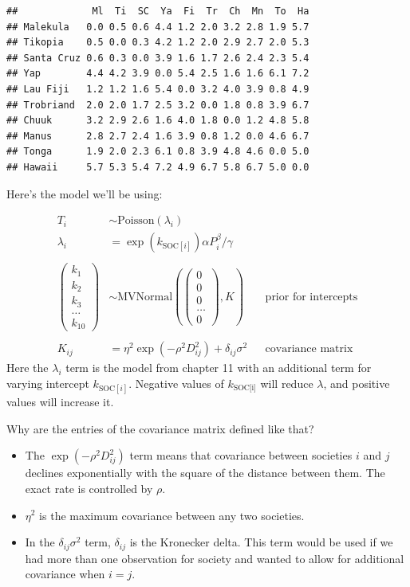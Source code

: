 \documentclass[
]{book}
\providecommand{\tightlist}{%
  \setlength{\itemsep}{0pt}\setlength{\parskip}{0pt}}
\begin{document}
\begin{verbatim}
##             Ml  Ti  SC  Ya  Fi  Tr  Ch  Mn  To  Ha
## Malekula   0.0 0.5 0.6 4.4 1.2 2.0 3.2 2.8 1.9 5.7
## Tikopia    0.5 0.0 0.3 4.2 1.2 2.0 2.9 2.7 2.0 5.3
## Santa Cruz 0.6 0.3 0.0 3.9 1.6 1.7 2.6 2.4 2.3 5.4
## Yap        4.4 4.2 3.9 0.0 5.4 2.5 1.6 1.6 6.1 7.2
## Lau Fiji   1.2 1.2 1.6 5.4 0.0 3.2 4.0 3.9 0.8 4.9
## Trobriand  2.0 2.0 1.7 2.5 3.2 0.0 1.8 0.8 3.9 6.7
## Chuuk      3.2 2.9 2.6 1.6 4.0 1.8 0.0 1.2 4.8 5.8
## Manus      2.8 2.7 2.4 1.6 3.9 0.8 1.2 0.0 4.6 6.7
## Tonga      1.9 2.0 2.3 6.1 0.8 3.9 4.8 4.6 0.0 5.0
## Hawaii     5.7 5.3 5.4 7.2 4.9 6.7 5.8 6.7 5.0 0.0
\end{verbatim}

Here's the model we'll be using:

\[
\begin{aligned}
T_i &\sim \text{Poisson}(\lambda_i) \\
\lambda_i &= \exp(k_{\text{SOC}[i]}) \alpha P_i^\beta / \gamma\\
\\
\begin{pmatrix}
k_1 \\
k_2 \\
k_3 \\
\dots \\
k_{10}
\end{pmatrix}
&\sim \text{MVNormal}\left( 
\begin{pmatrix}
0 \\
0 \\
0 \\
\dots \\
0
\end{pmatrix}
, K
\right) && \text{prior for intercepts}\\
\\
K_{ij} &= \eta^2 \exp(-\rho^2D^2_{ij}) + \delta_{ij}\sigma^2 && \text{covariance matrix}
\end{aligned}
\]
Here the \(\lambda_i\) term is the model from chapter 11 with an additional term for varying intercept \(k_{\text{SOC}[i]}\). Negative values of \(k_\text{SOC[i]}\) will reduce \(\lambda\), and positive values will increase it.

Why are the entries of the covariance matrix defined like that?

\begin{itemize}
\tightlist
\item
  The \(\exp(-\rho^2D^2_{ij})\) term means that covariance between societies \(i\) and \(j\) declines exponentially with the square of the distance between them. The exact rate is controlled by \(\rho\).
\item
  \(\eta^2\) is the maximum covariance between any two societies.
\item
  In the \(\delta_{ij}\sigma^2\) term, \(\delta_{ij}\) is the Kronecker delta. This term would be used if we had more than one observation for society and wanted to allow for additional covariance when \(i=j\).
\end{itemize}
\end{document}
